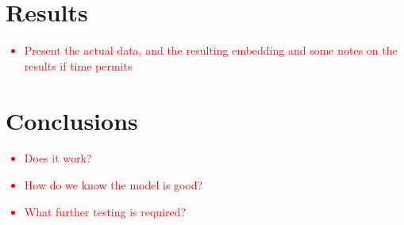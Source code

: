 \documentclass[a4paper, 10pt]{memoir}
\theoremstyle{plain}
\theoremstyle{definition}
\theoremstyle{remark}
\begin{document}
\chapter{Results}
\textcolor{red}{
\begin{itemize}
        \item Present the actual data, and the resulting embedding and some notes on the results if time permits
\end{itemize}}


\chapter{Conclusions}
\textcolor{red}{
\begin{itemize}
        \item Does it work?
        \item How do we know the model is good?
        \item What further testing is required?
\end{itemize}}



\newpage
\printbibliography
\end{document}

